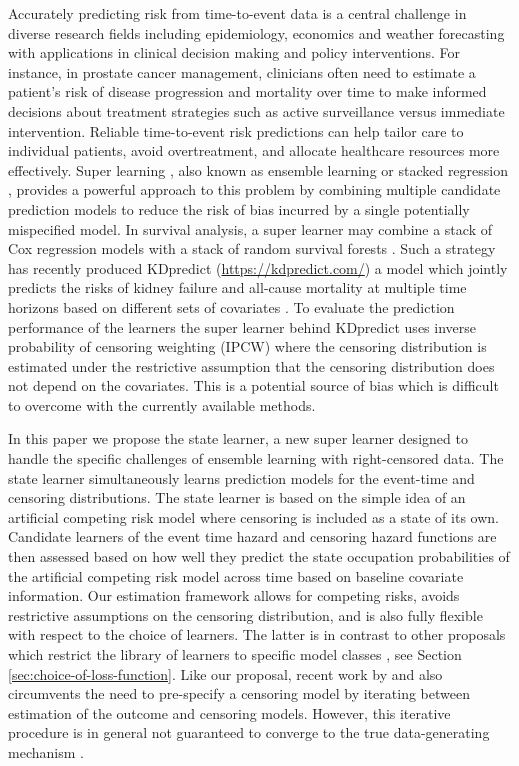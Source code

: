 \documentclass[a4paper,danish]{article}
\theoremstyle{plain} %
\numberwithin{theorem}{section}
\theoremstyle{definition} %
\theoremstyle{remark}
\newcommand{\1}{\mathds{1}}
\begin{document}
Accurately predicting risk from time-to-event data is a central
challenge in diverse research fields including epidemiology, economics
and weather forecasting with applications in clinical
decision making and policy interventions. For instance, in prostate
cancer management, clinicians often need to estimate a patient’s risk
of disease progression and mortality over time to make informed
decisions about treatment strategies such as active surveillance
versus immediate intervention. Reliable time-to-event risk predictions
can help tailor care to individual patients, avoid overtreatment, and
allocate healthcare resources more effectively. Super learning
\citep{van2007super}, also known as ensemble learning or stacked
regression \citep{wolpert1992stacked,breiman1996stacked}, provides a
powerful approach to this problem by combining multiple
candidate prediction models to reduce the risk of bias incurred by a
single potentially mispecified model. In survival analysis, a super
learner may combine a stack of Cox regression models with a stack of
random survival forests \citep[][Section 8.4]{gerds2021medical}. Such
a strategy has recently produced KDpredict
(\url{https://kdpredict.com/}) a model which jointly predicts the
risks of kidney failure and all-cause mortality at multiple time
horizons based on different sets of covariates
\citep{liu2024predicting}. To evaluate the prediction performance of
the learners the super learner behind KDpredict uses inverse
probability of censoring weighting (IPCW) where the censoring
distribution is estimated under the restrictive assumption that the
censoring distribution does not depend on the covariates. This is a
potential source of bias which is difficult to overcome with the
currently available methods.

In this paper we propose the state learner, a new super learner
designed to handle the specific challenges of ensemble learning with
right-censored data. The state learner simultaneously learns
prediction models for the event-time and censoring distributions. The
state learner is based on the simple idea of an artificial competing
risk model where censoring is included as a state of its
own. Candidate learners of the event time hazard and censoring hazard
functions are then assessed based on how well they predict the state
occupation probabilities of the artificial competing risk model across
time based on baseline covariate information. Our estimation framework
allows for competing risks, avoids restrictive assumptions on the
censoring distribution, and is also fully flexible with respect to the
choice of learners. The latter is in contrast to other proposals which
restrict the library of learners to specific model classes
\citep{polley2011-sl-cens,golmakani2020super}, see Section
\ref{sec:choice-of-loss-function}. Like our proposal, recent work by
\cite{han2021inverse} and \cite{westling2021inference} also
circumvents the need to pre-specify a censoring model by iterating
between estimation of the outcome and censoring models.
However, this iterative
procedure is in general not guaranteed to converge to the true
data-generating mechanism
\citep[][Appendix~A.4]{munch2024thesis}.
\end{document}
